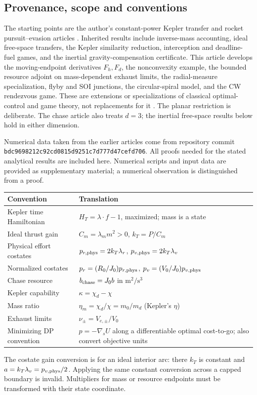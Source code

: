 \subsection{Provenance, scope and conventions}
The starting points are the author's constant-power Kepler transfer and
rocket pursuit--evasion articles \cite{OriginalKepler,OriginalChase}.
Inherited results include inverse-mass accounting, ideal free-space
transfers, the Kepler similarity reduction, interception and deadline-fuel
games, and the inertial gravity-compensation certificate. This article
develops the moving-endpoint derivatives $F_h,F_d$, the nonconvexity
example, the bounded resource adjoint on mass-dependent exhaust limits, the radial-measure
specialization, flyby and SOI junctions, the circular-spiral model, and the
CW rendezvous game. These are extensions or specializations of classical
optimal-control and game theory, not replacements for it
\cite{Pontryagin1962,Lawden1963,Isaacs1965}.
The planar restriction is deliberate. The chase article \cite{OriginalChase} also
treats $d=3$; the inertial free-space results below hold in either dimension.

Numerical data taken from the earlier articles come from repository commit
\nolinkurl{bdc9698212c92cd0815d9251c7d777d47cefd706}. All proofs needed for
the stated analytical results are included here. Numerical scripts and input
data are provided as supplementary material; a numerical observation is
distinguished from a proof.

\begin{center}\small
\begin{tabular}{@{}p{}p{}@{}}
\toprule Convention&Translation\\\midrule
Kepler time Hamiltonian&$H_T=\lambda\cdot f-1$, maximized; mass is a state\\
Ideal thrust gain&$C_m=\lambda_m m^2>0$, $k_T=P/C_m$\\
Physical effort costates&$p_{r,\rm phys}=2k_T\lambda_r$, $p_{v,\rm phys}=2k_T\lambda_v$\\
Normalized costates&$p_r=(R_0/J_0)p_{r,\rm phys}$, $p_v=(V_0/J_0)p_{v,\rm phys}$\\
Chase resource&$b_{\rm chase}=J_0b$ in $\mathrm{m^2/s^3}$\\
Kepler capability&$\kappa=\chi_d-\chi$\\
Mass ratio&$\eta_m=\chi_d/\chi=m_0/m_d$ (Kepler's $\eta$)\\
Exhaust limits&$\nu_\pm=V_{e,\pm}/V_0$\\
Minimizing DP convention&$p=-\nabla_s U$ along a differentiable optimal cost-to-go; also convert objective units\\
\bottomrule
\end{tabular}\end{center}
The costate gain conversion is for an ideal interior arc: there $k_T$ is
constant and $a=k_T\lambda_v=p_{v,\rm phys}/2$. Applying the same constant
conversion across a capped boundary is invalid. Multipliers for mass or
resource endpoints must be transformed with their state coordinate.

